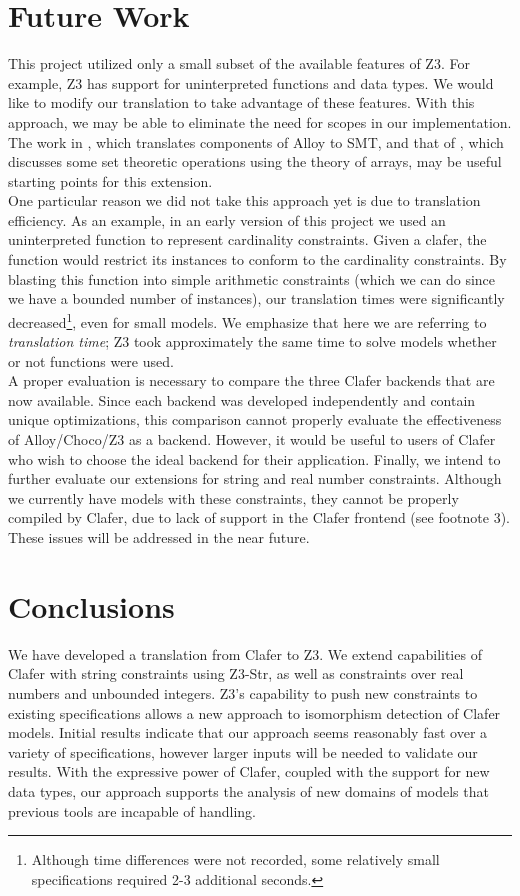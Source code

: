 \documentclass{easychair}
\begin{document}
\section{Future Work}
\label{future}
This project utilized only a small subset of the available features of Z3. For example, Z3 has support for uninterpreted functions and data types. We would like to modify our translation to take advantage of these features. With this approach, we may be able to eliminate the need for scopes in our implementation. The work in \cite{Achraf}, which translates components of Alloy to SMT, and that of \cite{Moura2009}, which discusses some set theoretic operations using the theory of arrays, may be useful starting points for this extension.\\
\indent One particular reason we did not take this approach yet is due to translation efficiency. As an example, in an early version of this project we used an uninterpreted function to represent cardinality constraints. Given a clafer, the function would restrict its instances to conform to the cardinality constraints. By blasting this function into simple arithmetic constraints (which we can do since we have a bounded number of instances), our translation times were significantly decreased\footnote{Although time differences were not recorded, some relatively small specifications required 2-3 additional seconds.}, even for small models. We emphasize that here we are referring to \textit{translation time}; Z3 took approximately the same time to solve models whether or not functions were used.\\
\indent A proper evaluation is necessary to compare the three Clafer backends that are now available. Since each backend was developed independently and contain unique optimizations, this comparison cannot properly evaluate the effectiveness of Alloy/Choco/Z3 as a backend. However, it would be useful to users of Clafer who wish to choose the ideal backend for their application. 
\indent Finally, we intend to further evaluate our extensions for string and real number constraints. Although we currently have models with these constraints, they cannot be properly compiled by Clafer, due to lack of support in the Clafer frontend (see footnote 3). These issues will be addressed in the near future. 

\section{Conclusions}
We have developed a translation from Clafer to Z3. We extend capabilities of Clafer with string constraints using Z3-Str, as well as constraints over real numbers and unbounded integers. Z3's capability to push new constraints to existing specifications allows a new approach to isomorphism detection of Clafer models. Initial results indicate that our approach seems reasonably fast over a variety of specifications, however larger inputs will be needed to validate our results. With the expressive power of Clafer, coupled with the support for new data types, our approach supports the analysis of new domains of models that previous tools are incapable of handling. 





\end{document}
